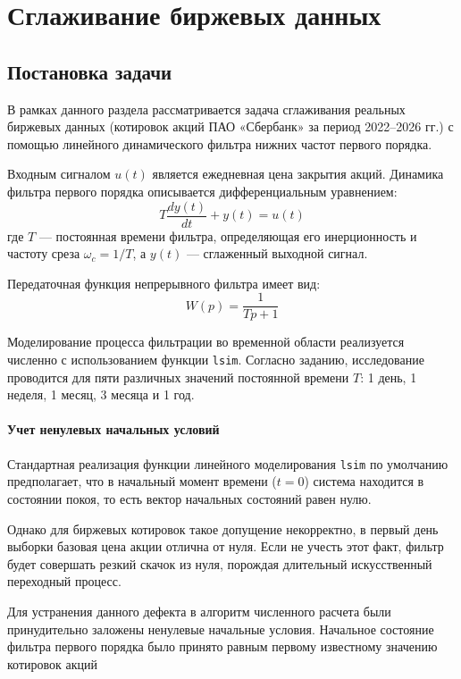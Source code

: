 \section{Сглаживание биржевых данных}

\subsection{Постановка задачи}
В рамках данного раздела рассматривается задача сглаживания реальных биржевых данных (котировок акций ПАО «Сбербанк» за период 2022–2026 гг.) с помощью линейного динамического фильтра нижних частот первого порядка.

Входным сигналом $u(t)$ является ежедневная цена закрытия акций. Динамика фильтра первого порядка описывается дифференциальным уравнением:
\begin{equation*}
    T \frac{dy(t)}{dt} + y(t) = u(t)
\end{equation*}
где $T$ — постоянная времени фильтра, определяющая его инерционность и частоту среза $\omega_c = 1/T$, а $y(t)$ — сглаженный выходной сигнал.

Передаточная функция непрерывного фильтра имеет вид:
\begin{equation*}
    W(p) = \frac{1}{Tp + 1}
\end{equation*}

Моделирование процесса фильтрации во временной области реализуется численно с использованием функции \texttt{lsim}. Согласно заданию, исследование проводится для пяти различных значений постоянной времени $T$: 1 день, 1 неделя, 1 месяц, 3 месяца и 1 год.

\paragraph{Учет ненулевых начальных условий}

Стандартная реализация функции линейного моделирования \texttt{lsim} по умолчанию предполагает, что в начальный момент времени ($t = 0$) система находится в состоянии покоя, то есть вектор начальных состояний равен нулю.

Однако для биржевых котировок такое допущение некорректно, в первый день выборки базовая цена акции отлична от нуля. Если не учесть этот факт, фильтр будет совершать резкий скачок из нуля, порождая длительный искусственный переходный процесс.

Для устранения данного дефекта в алгоритм численного расчета были принудительно заложены ненулевые начальные условия. Начальное состояние фильтра первого порядка было принято равным первому известному значению котировок акций

